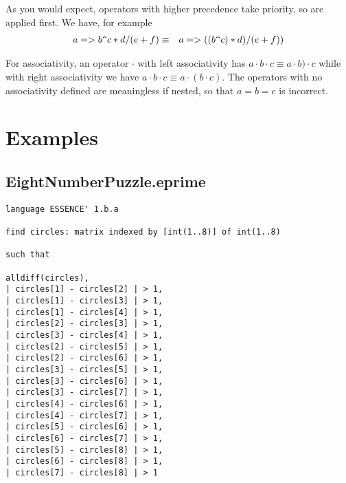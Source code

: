 \documentclass{article}
\begin{document}
As you would expect, operators with higher precedence take priority, so are applied first.   We have, for example 
\begin{eqnarray*}
a => b \verb.^. c * d / ( e + f ) & \equiv & a => ( (b \verb.^. c) * d ) /  (e + f) )
\end{eqnarray*}

For associativity, an operator $\cdot$ with left associativity has 
$a \cdot b \cdot c \equiv  a \cdot b) \cdot c$ while with right associativity we have 
$a \cdot b \cdot  c \equiv a \cdot (b \cdot c)$.   The operators with no associativity defined are meaningless if nested, so that $a = b = c$ is incorrect.    



\section{Examples} 

\subsection{EightNumberPuzzle.eprime}
\begin{verbatim}
language ESSENCE' 1.b.a

find circles: matrix indexed by [int(1..8)] of int(1..8)

such that

alldiff(circles),
| circles[1] - circles[2] | > 1,
| circles[1] - circles[3] | > 1,
| circles[1] - circles[4] | > 1,
| circles[2] - circles[3] | > 1,
| circles[3] - circles[4] | > 1,
| circles[2] - circles[5] | > 1,
| circles[2] - circles[6] | > 1,
| circles[3] - circles[5] | > 1,
| circles[3] - circles[6] | > 1,
| circles[3] - circles[7] | > 1,
| circles[4] - circles[6] | > 1,
| circles[4] - circles[7] | > 1,
| circles[5] - circles[6] | > 1,
| circles[6] - circles[7] | > 1,
| circles[5] - circles[8] | > 1,
| circles[6] - circles[8] | > 1,
| circles[7] - circles[8] | > 1
\end{verbatim}
\end{document}

